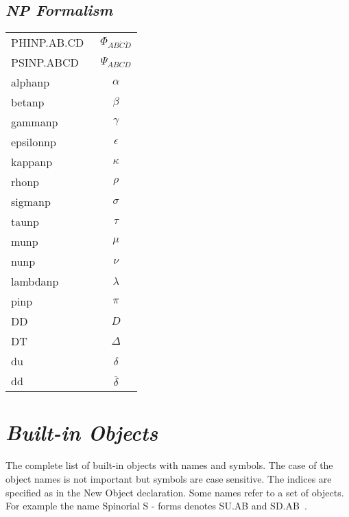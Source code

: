 \documentclass[twocolumn]{article}
\newcommand{\grgtt}{\ttfamily}
\renewcommand{\tt}{\grgtt}
\begin{document}
\subsection{\sf\slshape NP Formalism}

\begin{tabular}{|l|c|}
\hline
\tt  PHINP.AB.CD~ &  $\Phi_{AB\dot{C}\dot{D}}$  \\
\tt  PSINP.ABCD   &  $\Psi_{ABCD}$              \\
\hline
\tt  alphanp      & $\alpha$ \\
\tt  betanp       & $\beta$ \\
\tt  gammanp      & $\gamma$ \\
\tt  epsilonnp    & $\epsilon$ \\
\tt  kappanp      & $\kappa$ \\
\tt  rhonp        & $\rho$ \\
\tt  sigmanp      & $\sigma$ \\
\tt  taunp        & $\tau$ \\
\tt  munp         & $\mu$ \\
\tt  nunp         & $\nu$ \\
\tt  lambdanp     & $\lambda$ \\
\tt  pinp         & $\pi$ \\
\hline
\tt  DD           & $D$ \\
\tt  DT           & $\Delta$ \\
\tt  du           & $\delta$ \\
\tt  dd           & $\overline\delta$ \\
\hline
\end{tabular}



\section{\LARGE\sf\slshape Built-in Objects}

\tabcolsep=1mm

The complete list of built-in objects with names and symbols.
The case of the object names is not important but symbols
are case sensitive. The indices are specified as in the
{\tt New Object} declaration. Some names refer to a set
of objects. For example the name {\tt Spinorial S - forms}
denotes {\tt SU.AB} and {\tt SD.AB~}.
\end{document}
